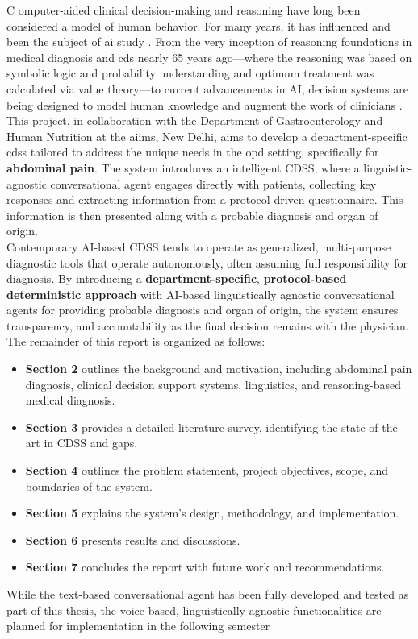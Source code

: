 \lettrine{C}{ }omputer-aided clinical decision-making and reasoning have long been considered a model of human behavior. For many years, it has influenced and been the subject of \gls{ai} study \cite{cohen2022introducing}. From the very inception of reasoning foundations in medical diagnosis and \gls{cds} nearly 65 years ago---where the reasoning was based on symbolic logic and probability understanding and optimum treatment was calculated via value theory---to current advancements in AI, decision systems are being designed to model human knowledge and augment the work of clinicians \cite{ledley1959reasoning, rajkomar2019machine}.\\

\noindent This project, in collaboration with the Department of Gastroenterology and Human Nutrition at the \gls{aiims}, New Delhi, aims to develop a department-specific \gls{cdss} tailored to address the unique needs in the \gls{opd} setting, specifically for \textcolor{TUMRed}{\textbf{abdominal pain}}. The system introduces an intelligent CDSS, where a linguistic-agnostic conversational agent engages directly with patients, collecting key responses and extracting information from a protocol-driven questionnaire. This information is then presented along with a probable diagnosis and organ of origin.\\

\noindent Contemporary AI-based CDSS tends to operate as generalized, multi-purpose diagnostic tools that operate autonomously, often assuming full responsibility for diagnosis. By introducing a \textcolor{TUMRed}{\textbf{department-specific}}, \textcolor{TUMRed}{\textbf{protocol-based deterministic approach}} with AI-based linguistically agnostic conversational agents for providing probable diagnosis and organ of origin, the system ensures transparency, and accountability as the final decision remains with the physician.\\

\noindent The remainder of this report is organized as follows:
\begin{itemize}
    \item \textcolor{TUMRed}{\textbf{Section 2}} outlines the background and motivation, including abdominal pain diagnosis, clinical decision support systems, linguistics, and reasoning-based medical diagnosis.
    \item \textcolor{TUMRed}{\textbf{Section 3}} provides a detailed literature survey, identifying the state-of-the-art in CDSS and gaps.
    \item \textcolor{TUMRed}{\textbf{Section 4}} outlines the problem statement, project objectives, scope, and boundaries of the system.
    \item \textcolor{TUMRed}{\textbf{Section 5}} explains the system's design, methodology, and implementation.
    \item \textcolor{TUMRed}{\textbf{Section 6}} presents results and discussions.
    \item \textcolor{TUMRed}{\textbf{Section 7}} concludes the report with future work and recommendations.
\end{itemize}

\noindent While the text-based conversational agent has been fully developed and tested as part of this thesis, the voice-based, linguistically-agnostic functionalities are planned for implementation in the following semester